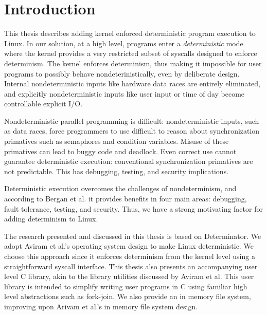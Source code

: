 \section{Introduction}
\label{s:intro}

This thesis describes adding kernel enforced deterministic program execution to
Linux. In our solution, at a high level, programs enter a \emph{deterministic}
mode where the kernel provides a very restricted subset of syscalls designed to
enforce determinism. The kernel enforces determinism, thus making it impossible
for user programs to possibly behave nondeterinistically, even by deliberate
design. Internal nondeterministic inputs like hardware data races are entirely
eliminated, and explicitly nondeterministic inputs like user input or time of
day become controllable explicit I/O.

\iffalse
A program is deterministic if for a fixed input, the program always returns the
same ouput. This is desirable, because it simplifies testing and debugging of
ever more ubiquitous parallel progams. Linux's parallel programming model is
inherently nondeterministic, but having the option to run deterministically
would be a great feature as computing moves towards using multiple cores.
\fi

Nondeterministic parallel programming is difficult: nondeterministic inputs,
such as data races, force programmers to use difficult to reason about
synchronization primatives such as semaphores and condition variables.
Misuse of these primatives can lead to buggy code and deadlock. Even
correct use cannot guarantee deterministic execution: conventional
synchronization primatives are not predictable. This has debugging, testing,
and security implications.

Deterministic execution overcomes the challenges of nondeterminism, and
according to Bergan et al. it provides benefits in four main areas: debugging,
fault tolerance, testing, and security. Thus, we have a strong motivating factor
for adding determinism to Linux.

\iffalse
Techniques exist to provide benefits
in single areas, though these solutions do not "compose well with one another."
Determinism by itself provides benefits in all four areas. Thus, we have a
strong motivating factor for adding determinism to Linux.
\fi

The research presented and discussed in this thesis is based on Determinator.
We adopt Aviram et al.'s operating system design to make Linux deterministic. We
choose this approach since it enforces determinism from the kernel level using a
straightforward syscall interface. This thesis also presents an accompanying
user level C library, akin to the library utilities discussed by Aviram et al.
This user library is intended to simplify writing user programs in C using
familiar high level abstractions such as fork-join. We also provide an in memory
file system, improving upon Arivam et al.'s in memory file system design.

